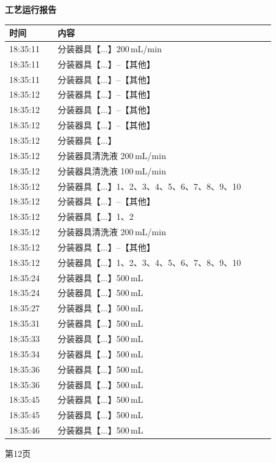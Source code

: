 \documentclass[UTF8,10pt,a4paper,fontset=fandol]{ctexart}
\begin{document}
\begin{minipage}[t]{0.47\linewidth}
\centering
\textbf{工艺运行报告}

\vspace{2pt}
\scriptsize
\begin{tabular}{|p{0.16\linewidth}|p{0.72\linewidth}|}
\hline
时间 & 内容 \\ \hline
18:35:11 & 分装器具【...】200\,mL/min \\ \hline
18:35:11 & 分装器具【...】--【其他】 \\ \hline
18:35:11 & 分装器具【...】--【其他】 \\ \hline
18:35:12 & 分装器具【...】--【其他】 \\ \hline
18:35:12 & 分装器具【...】--【其他】 \\ \hline
18:35:12 & 分装器具【...】--【其他】 \\ \hline
18:35:12 & 分装器具【...】 \\ \hline
18:35:12 & 分装器具清洗液 200\,mL/min \\ \hline
18:35:12 & 分装器具清洗液 100\,mL/min \\ \hline
18:35:12 & 分装器具【...】1、2、3、4、5、6、7、8、9、10 \\ \hline
18:35:12 & 分装器具【...】--【其他】 \\ \hline
18:35:12 & 分装器具【...】1、2 \\ \hline
18:35:12 & 分装器具清洗液 200\,mL/min \\ \hline
18:35:12 & 分装器具【...】--【其他】 \\ \hline
18:35:12 & 分装器具【...】1、2、3、4、5、6、7、8、9、10 \\ \hline
18:35:24 & 分装器具【...】500\,mL \\ \hline
18:35:24 & 分装器具【...】500\,mL \\ \hline
18:35:27 & 分装器具【...】500\,mL \\ \hline
18:35:31 & 分装器具【...】500\,mL \\ \hline
18:35:33 & 分装器具【...】500\,mL \\ \hline
18:35:34 & 分装器具【...】500\,mL \\ \hline
18:35:36 & 分装器具【...】500\,mL \\ \hline
18:35:36 & 分装器具【...】500\,mL \\ \hline
18:35:45 & 分装器具【...】500\,mL \\ \hline
18:35:45 & 分装器具【...】500\,mL \\ \hline
18:35:46 & 分装器具【...】500\,mL \\ \hline
\end{tabular}

\vspace{2pt}
\tiny 第12页
\end{minipage}
\end{document}
